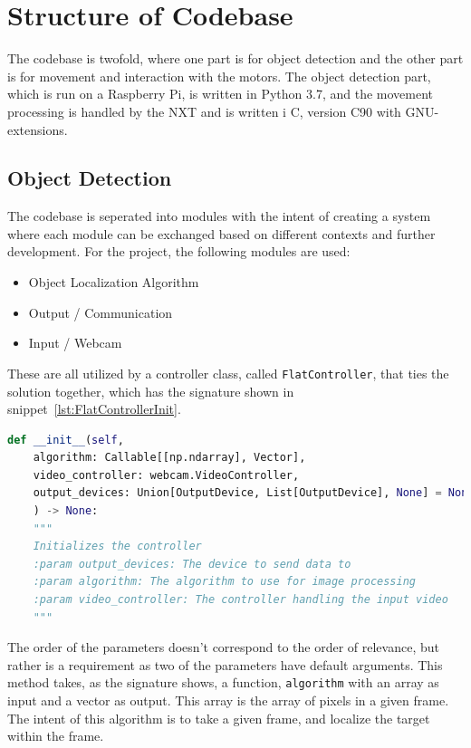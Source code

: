 \section{Structure of Codebase}
The codebase is twofold, where one part is for object detection and the other part is for movement and interaction with the motors.
The object detection part, which is run on a Raspberry Pi, is written in Python 3{.}7, and the movement processing is handled by the NXT and is written i C, version C90 with GNU-extensions.


\subsection{Object Detection}
The codebase is seperated into modules with the intent of creating a system where each module can be exchanged based on different contexts and further development.
For the project, the following modules are used:
\begin{itemize}
	\item Object Localization Algorithm
	\item Output / Communication
	\item Input / Webcam
\end{itemize}

These are all utilized by a controller class, called \texttt{FlatController}, that ties the solution together, which has the signature shown in snippet~\ref{lst:FlatControllerInit}.
\begin{lstlisting}[language=Python,label={lst:FlatControllerInit},caption={Initialization method of the \texttt{FlatController} class}]
def __init__(self,
	algorithm: Callable[[np.ndarray], Vector],
	video_controller: webcam.VideoController,
	output_devices: Union[OutputDevice, List[OutputDevice], None] = None,
	) -> None:
	"""
	Initializes the controller
	:param output_devices: The device to send data to
	:param algorithm: The algorithm to use for image processing
	:param video_controller: The controller handling the input video
	"""
\end{lstlisting}

The order of the parameters doesn't correspond to the order of relevance, but rather is a requirement as two of the parameters have default arguments.
This method takes, as the signature shows, a function, \texttt{algorithm} with an array as input and a vector as output.
This array is the array of pixels in a given frame.
The intent of this algorithm is to take a given frame, and localize the target within the frame.


